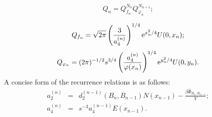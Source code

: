 \begin{equation}
	Q_n = Q_{f_n}^{N_n} Q_{\varphi_{n}}^{N_{n+1}};
\end{equation}

\begin{equation*}
	Q_{f_n} = \sqrt{2\pi}\left(\frac{3}{a_4^{(n)}}\right)^{1/4} {\rm e}^{x_n^2/4} U(0,x_n);
\end{equation*}
\begin{equation*}
	Q_{\varphi_n} = (2\pi)^{-1/2} s^{3/4} \left(\frac{a_4^{(n)}}{\varphi(x_n)}\right)^{1/4} {\rm e}^{y_n^2/4} U(0,y_n).
\end{equation*}
A concise form of the recurrence relations is as follows:
\begin{eqnarray}
	a_2^{(n)} & = & d_2^{(n-1)}(B_n, B_{n-1}) N(x_{n-1}) - \frac{\beta\hat{\Phi}_{B_n, B_{n-1}}}{V};
	\\
	a_4^{(n)} & = & s^{-3} a_4^{(n-1)} E(x_{n-1}).
\end{eqnarray}

